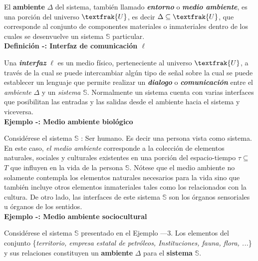 El \textbf{ambiente} $\Delta$ del sistema, también llamado \textit{\textbf{entorno}} o \textit{\textbf{medio ambiente}}, es una porción del universo $\textfrak{U}$, es decir $\Delta \subseteq \textfrak{U} $, que corresponde al conjunto de componentes materiales o inmateriales dentro de los cuales se desenvuelve un sistema $\mathbb{S}$ particular.\\

\textbf{Definición -: Interfaz de comunicación $\ell$}\\


Una \textit{\textbf{interfaz}} $\ell$ es un medio físico, perteneciente al universo $\textfrak{U}$, a través de la cual se puede intercambiar algún tipo de señal sobre la cual se puede establecer un lenguaje que permite realizar un \textit{\textbf{dialogo}} o \textit{\textbf{comunicación}} entre el \textit{ambiente} $\Delta$ y un \textit{sistema} $\mathbb{S}$. Normalmente un sistema cuenta con varias interfaces que posibilitan las entradas y las salidas desde el ambiente hacia el sistema y viceversa.\\

\textbf{Ejemplo -: Medio ambiente biológico}\\


Considérese el sistema $\mathbb{S}$ : Ser humano. Es decir una persona vista como sistema. En este caso, \textit{el medio ambiente} corresponde a la colección de elementos naturales, sociales y culturales existentes
en una porción del espacio-tiempo $ \tau \subseteq$ $T$ que influyen en la vida de la persona $\mathbb{S}$. Nótese que el medio ambiente no solamente contempla los elementos naturales necesarios para la vida sino que también incluye otros elementos inmateriales tales como los relacionados con la cultura. De otro lado, las interfaces de este sistema $\mathbb{S}$ son los órganos sensoriales u órganos de los sentidos.\\

\textbf{Ejemplo -: Medio ambiente sociocultural}\\


Considérese el sistema $\mathbb{S}$ presentado en el Ejemplo —3. Los elementos del conjunto \{\textit{territorio, empresa estatal de petróleos, Instituciones, fauna, flora, ...}\} y sus relaciones constituyen un \textbf{ambiente} $\Delta$ para el \textbf{sistema} $\mathbb{S}$.\\

